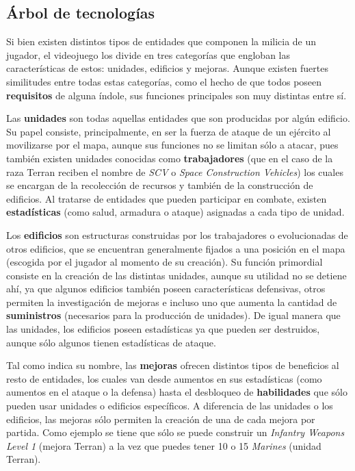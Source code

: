\subsection{Árbol de tecnologías}

Si bien existen distintos tipos de entidades que componen la milicia de un jugador, el videojuego los divide en tres categorías que engloban las características de estos: unidades, edificios y mejoras. Aunque existen fuertes similitudes entre todas estas categorías, como el hecho de que todos poseen \textbf{requisitos} de alguna índole, sus funciones principales son muy distintas entre sí.

Las \textbf{unidades} son todas aquellas entidades que son producidas por algún edificio. Su papel consiste, principalmente, en ser la fuerza de ataque de un ejército al movilizarse por el mapa, aunque sus funciones no se limitan sólo a atacar, pues también existen unidades conocidas como \textbf{trabajadores} (que en el caso de la raza Terran reciben el nombre de \textit{SCV} o \textit{Space Construction Vehicles}) los cuales se encargan de la recolección de recursos y también de la construcción de edificios. Al tratarse de entidades que pueden participar en combate, existen \textbf{estadísticas} (como salud, armadura o ataque) asignadas a cada tipo de unidad.

Los \textbf{edificios} son estructuras construidas por los trabajadores o evolucionadas de otros edificios, que se encuentran generalmente fijados a una posición en el mapa (escogida por el jugador al momento de su creación). Su función primordial consiste en la creación de las distintas unidades, aunque su utilidad no se detiene ahí, ya que algunos edificios también poseen características defensivas, otros permiten la investigación de mejoras e incluso uno que aumenta la cantidad de \textbf{suministros} (necesarios para la producción de unidades). De igual manera que las unidades, los edificios poseen estadísticas ya que pueden ser destruidos, aunque sólo algunos tienen estadísticas de ataque.

Tal como indica su nombre, las \textbf{mejoras} ofrecen distintos tipos de beneficios al resto de entidades, los cuales van desde aumentos en sus estadísticas (como aumentos en el ataque o la defensa) hasta el desbloqueo de \textbf{habilidades} que sólo pueden usar unidades o edificios específicos. A diferencia de las unidades o los edificios, las mejoras sólo permiten la creación de una de cada mejora por partida. Como ejemplo se tiene que sólo se puede construir un \textit{Infantry Weapons Level 1} (mejora Terran) a la vez que puedes tener 10 o 15 \textit{Marines} (unidad Terran).

